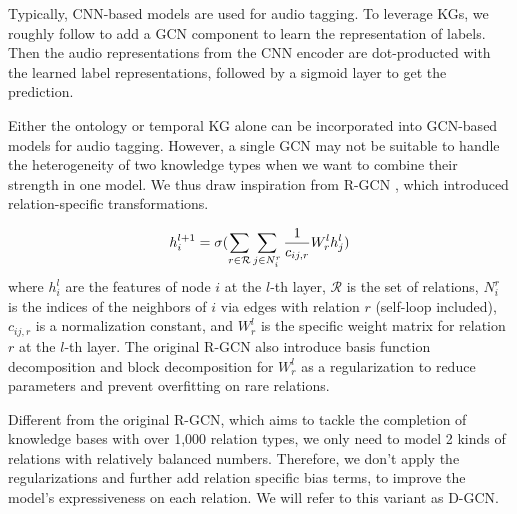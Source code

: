 Typically, CNN-based models \citep{kong2020panns} are used for audio tagging. To leverage KGs, we roughly follow \citep{wang2020modeling} to add a GCN component to learn the representation of labels. Then the audio representations from the CNN encoder are dot-producted with the learned label representations, followed by a sigmoid layer to get the prediction. 

Either the ontology or temporal KG alone can be incorporated into GCN-based models for audio tagging. However, a single GCN may not be suitable to handle the heterogeneity of two knowledge types when we want to combine their strength in one model. We thus draw inspiration from R-GCN \citep{schlichtkrull2018modeling}, which introduced relation-specific transformations.

\begin{equation}
\setlength{\abovedisplayskip}{3pt}
\setlength{\belowdisplayskip}{3pt}
  h_i^{l+1} = \sigma(\sum_{r \in \mathcal{R}} \sum_{j \in N^r_i} \frac{1}{c_{ij, r}} W^{l}_r h^{l}_j)
\end{equation}
where $h_i^{l}$ are the features of node $i$ at the $l$-th layer, $\mathcal{R}$ is the set of relations, $N^r_i$ is the indices of the neighbors of $i$ via edges with relation $r$ (self-loop included), $c_{ij, r}$ is a normalization constant, and $W^{l}_r$ is the specific weight matrix for relation $r$ at the $l$-th layer. The original R-GCN also introduce basis function decomposition and block decomposition for $W^{l}_r$ as a regularization to reduce parameters and prevent overfitting on rare relations.

Different from the original R-GCN, which aims to tackle the completion of knowledge bases with over 1,000 relation types, we only need to model 2 kinds of relations with relatively balanced numbers. Therefore, we don't apply the regularizations and further add relation specific bias terms, to improve the model's expressiveness on each relation. We will refer to this variant as D-GCN.
